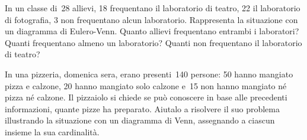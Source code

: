 \begin{multicols}{2}
% 
% 

\begin{esercizio}
\label{ese:7.31}
In un classe di~28 allievi, 18 frequentano il laboratorio di teatro,
22 il laboratorio di fotografia, 3 non frequentano alcun laboratorio.
Rappresenta la situazione con un diagramma di Eulero-Venn. Quanto
allievi frequentano entrambi i laboratori? Quanti frequentano almeno un
laboratorio? Quanti non frequentano il laboratorio di teatro?
\end{esercizio}

\begin{esercizio}
\label{ese:7.32}
In una pizzeria, domenica sera, erano presenti~140 persone: 50 hanno
mangiato pizza e calzone, 20 hanno mangiato solo calzone e~15 non hanno
mangiato né pizza né calzone. Il pizzaiolo si chiede se può
conoscere in base alle precedenti informazioni, quante pizze ha
preparato. Aiutalo a risolvere il suo problema illustrando la
situazione con un diagramma di Venn, assegnando a ciascun insieme la
sua cardinalità.
\end{esercizio}


\end{multicols}
